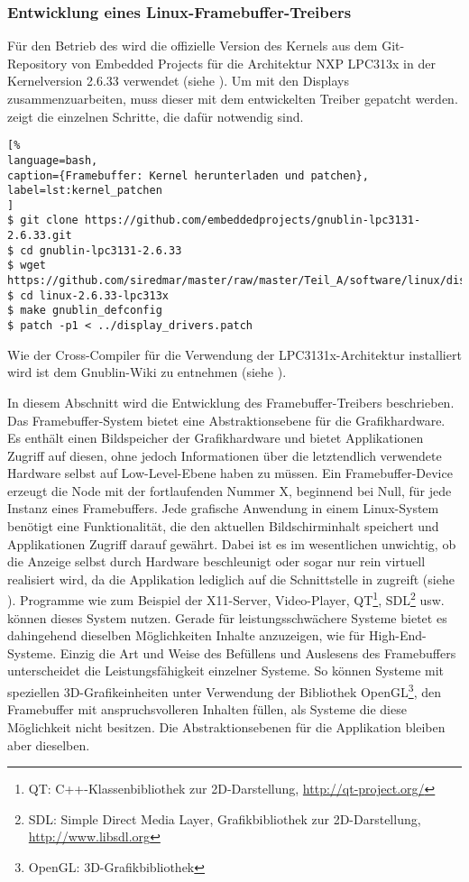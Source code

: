 \subsubsection{Entwicklung eines Linux-Framebuffer-Treibers}
Für den Betrieb des  wird die offizielle Version des Kernels aus dem Git-Repository von Embedded Projects für die Architektur NXP LPC313x in der Kernelversion 2.6.33 verwendet (siehe \cite{GnublinWiki2013b}). Um mit den Displays zusammenzuarbeiten, muss dieser mit dem entwickelten Treiber gepatcht werden.  zeigt die einzelnen Schritte, die dafür notwendig sind.

\begin{lstlisting}[%
language=bash,
caption={Framebuffer: Kernel herunterladen und patchen},
label=lst:kernel_patchen
]
$ git clone https://github.com/embeddedprojects/gnublin-lpc3131-2.6.33.git
$ cd gnublin-lpc3131-2.6.33
$ wget https://github.com/siredmar/master/raw/master/Teil_A/software/linux/display_drivers.patch
$ cd linux-2.6.33-lpc313x
$ make gnublin_defconfig
$ patch -p1 < ../display_drivers.patch
\end{lstlisting}
Wie der Cross-Compiler für die Verwendung der LPC3131x-Architektur installiert wird ist dem Gnublin-Wiki zu entnehmen (siehe \cite{GnublinWiki2013c}).

In diesem Abschnitt wird die Entwicklung des Framebuffer-Treibers beschrieben. Das Framebuffer-System bietet eine Abstraktionsebene für die Grafikhardware. Es enthält einen Bildspeicher der Grafikhardware und bietet Applikationen Zugriff auf diesen, ohne jedoch Informationen über die letztendlich verwendete Hardware selbst auf Low-Level-Ebene haben zu müssen. Ein Framebuffer-Device erzeugt die Node  mit der fortlaufenden Nummer X, beginnend bei Null, für jede Instanz eines Framebuffers. Jede grafische Anwendung in einem Linux-System benötigt eine Funktionalität, die den aktuellen Bildschirminhalt speichert und Applikationen Zugriff darauf gewährt. Dabei ist es im wesentlichen unwichtig, ob die Anzeige selbst durch Hardware beschleunigt oder sogar nur rein virtuell realisiert wird, da die Applikation lediglich auf die Schnittstelle in  zugreift (siehe  \cite{LinuxKernelFB}).
Programme wie zum Beispiel der X11-Server, Video-Player, QT\footnote{QT: C++-Klassenbibliothek zur 2D-Darstellung, \url{http://qt-project.org/}}, SDL\footnote{SDL: Simple Direct Media Layer, Grafikbibliothek zur 2D-Darstellung, \url{http://www.libsdl.org}} usw. können dieses System nutzen. Gerade für leistungsschwächere Systeme bietet es dahingehend dieselben Möglichkeiten Inhalte anzuzeigen, wie für High-End-Systeme. Einzig die Art und Weise des Befüllens und Auslesens des Framebuffers unterscheidet die Leistungsfähigkeit einzelner Systeme. So können Systeme mit speziellen 3D-Grafikeinheiten unter Verwendung der Bibliothek OpenGL\footnote{OpenGL: 3D-Grafikbibliothek}, den Framebuffer mit anspruchsvolleren Inhalten füllen, als Systeme die diese Möglichkeit nicht besitzen. Die Abstraktionsebenen für die Applikation bleiben aber dieselben. 

